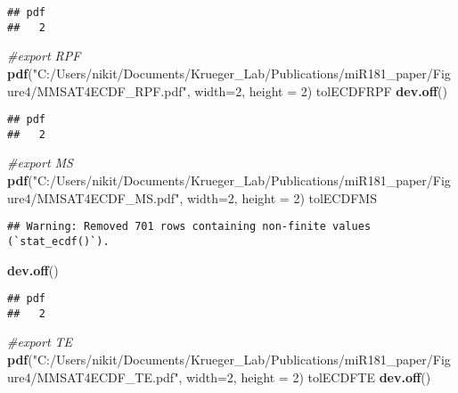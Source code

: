 \documentclass[
]{article}
\newenvironment{Shaded}{\begin{snugshade}}{\end{snugshade}}
\newcommand{\AttributeTok}[1]{\textcolor[rgb]{0.13,0.29,0.53}{#1}}
\newcommand{\CommentTok}[1]{\textcolor[rgb]{0.56,0.35,0.01}{\textit{#1}}}
\newcommand{\DecValTok}[1]{\textcolor[rgb]{0.00,0.00,0.81}{#1}}
\newcommand{\FunctionTok}[1]{\textcolor[rgb]{0.13,0.29,0.53}{\textbf{#1}}}
\newcommand{\NormalTok}[1]{#1}
\newcommand{\StringTok}[1]{\textcolor[rgb]{0.31,0.60,0.02}{#1}}
\begin{document}
\begin{verbatim}
## pdf 
##   2
\end{verbatim}

\begin{Shaded}
\begin{Highlighting}[]
\CommentTok{\#export RPF}
\FunctionTok{pdf}\NormalTok{(}\StringTok{"C:/Users/nikit/Documents/Krueger\_Lab/Publications/miR181\_paper/Figure4/MMSAT4ECDF\_RPF.pdf"}\NormalTok{, }\AttributeTok{width=}\DecValTok{2}\NormalTok{, }\AttributeTok{height =} \DecValTok{2}\NormalTok{)}
\NormalTok{tolECDFRPF}
\FunctionTok{dev.off}\NormalTok{()}
\end{Highlighting}
\end{Shaded}

\begin{verbatim}
## pdf 
##   2
\end{verbatim}

\begin{Shaded}
\begin{Highlighting}[]
\CommentTok{\#export MS}
\FunctionTok{pdf}\NormalTok{(}\StringTok{"C:/Users/nikit/Documents/Krueger\_Lab/Publications/miR181\_paper/Figure4/MMSAT4ECDF\_MS.pdf"}\NormalTok{, }\AttributeTok{width=}\DecValTok{2}\NormalTok{, }\AttributeTok{height =} \DecValTok{2}\NormalTok{)}
\NormalTok{tolECDFMS}
\end{Highlighting}
\end{Shaded}

\begin{verbatim}
## Warning: Removed 701 rows containing non-finite values (`stat_ecdf()`).
\end{verbatim}

\begin{Shaded}
\begin{Highlighting}[]
\FunctionTok{dev.off}\NormalTok{()}
\end{Highlighting}
\end{Shaded}

\begin{verbatim}
## pdf 
##   2
\end{verbatim}

\begin{Shaded}
\begin{Highlighting}[]
\CommentTok{\#export TE}
\FunctionTok{pdf}\NormalTok{(}\StringTok{"C:/Users/nikit/Documents/Krueger\_Lab/Publications/miR181\_paper/Figure4/MMSAT4ECDF\_TE.pdf"}\NormalTok{, }\AttributeTok{width=}\DecValTok{2}\NormalTok{, }\AttributeTok{height =} \DecValTok{2}\NormalTok{)}
\NormalTok{tolECDFTE}
\FunctionTok{dev.off}\NormalTok{()}
\end{Highlighting}
\end{Shaded}
\end{document}
